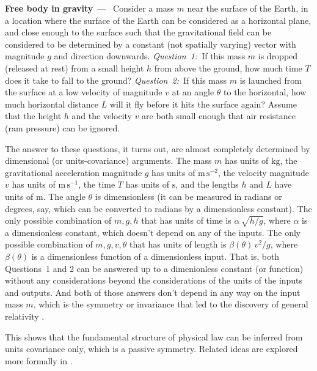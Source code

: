\documentclass{article}
\newcommand{\unit}[1]{\mathrm{#1}}
\newcommand{\kg}{\unit{kg}}
\newcommand{\m}{\unit{m}}
\newcommand{\s}{\unit{s}}
\renewcommand{\paragraph}[1]{\par\textbf{#1}~---~}
\begin{document}
\paragraph{Free body in gravity}
Consider a mass $m$ near the surface of the Earth, in a location where the surface of the Earth can be considered as a horizontal plane, and close enough to the surface such that the gravitational field can be considered to be determined by a constant (not spatially varying) vector with magnitude $g$ and direction downwards.
\textsl{Question~1:}~If this mass $m$ is dropped (released at rest) from a small height $h$ from above the ground, how much time $T$ does it take to fall to the ground?
\textsl{Question~2:}~If this mass $m$ is launched from the surface at a low velocity of magnitude $v$ at an angle $\theta$ to the horizontal, how much horizontal distance $L$ will it fly before it hits the surface again?
Assume that the height $h$ and the velocity $v$ are both small enough that air resistance (ram pressure) can be ignored.

The answer to these questions, it turns out, are almost completely determined by dimensional (or units-covariance) arguments.
The mass $m$ has units of $\kg$, the gravitational acceleration magnitude $g$ has units of $\m\,\s^{-2}$, the velocity magnitude $v$ has units of $\m\,\s^{-1}$, the time $T$ has units of $\s$, and the lengths $h$ and $L$ have units of $\m$.
The angle $\theta$ is dimensionless (it can be measured in radians or degrees, say, which can be converted to radians by a dimensionless constant).
The only possible combination of $m, g, h$ that has units of time is $\alpha\,\sqrt{h/g}$, where $\alpha$ is a dimensionless constant, which doesn't depend on any of the inputs.
The only possible combination of $m, g, v, \theta$ that has units of length is $\beta(\theta)\,v^2/g$, where $\beta(\theta)$ is a dimensionless function of a dimensionless input.
That is, both Questions~1 and 2 can be answered up to a dimenionless constant (or function) without any considerations beyond the considerations of the units of the inputs and outputs.
And both of those answers don't depend in any way on the input mass $m$, which is the symmetry or invariance that led to the discovery of general relativity \cite{gr}.

This shows that the fundamental structure of physical law can be inferred from units covariance only, which is a passive symmetry.  Related ideas are explored more formally in \cite{villar2022dimensionless}.
\end{document}
